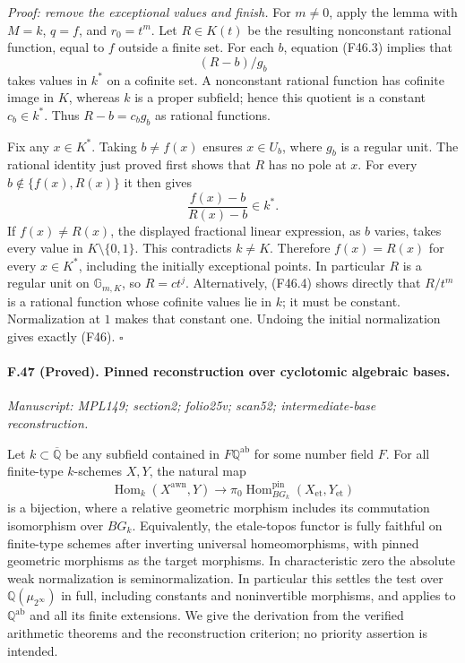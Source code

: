 \emph{Proof: remove the exceptional values and finish.}
For $m\ne0$, apply the lemma with $M=k$, $q=f$, and $r_0=t^m$.
Let $R\in K(t)$ be the resulting nonconstant rational function,
equal to $f$ outside a finite set. For each $b$, equation (F46.3)
implies that
\[
 (R-b)/g_b
\]
takes values in $k^*$ on a cofinite set. A nonconstant rational
function has cofinite image in $K$, whereas $k$ is a proper
subfield; hence this quotient is a constant $c_b\in k^*$.
Thus $R-b=c_b g_b$ as rational functions.

Fix any $x\in K^*$. Taking $b\ne f(x)$ ensures $x\in U_b$,
where $g_b$ is a regular unit. The rational identity just proved
first shows that $R$ has no pole at $x$. For every
$b\notin\{f(x),R(x)\}$ it then gives
\[
 \frac{f(x)-b}{R(x)-b}\in k^*.
\]
If $f(x)\ne R(x)$, the displayed fractional linear expression,
as $b$ varies, takes every value in $K\setminus\{0,1\}$.
This contradicts $k\ne K$. Therefore $f(x)=R(x)$ for every
$x\in K^*$, including the initially exceptional points.
In particular $R$ is a regular unit on $\mathbb G_{m,K}$, so
$R=c t^j$. Alternatively, (F46.4) shows directly that
$R/t^m$ is a rational function whose cofinite values lie in $k$;
it must be constant. Normalization at $1$ makes that constant one.
Undoing the initial normalization gives exactly (F46).
\hfill$\square$


\paragraph{F.47 (Proved). Pinned reconstruction over cyclotomic algebraic bases.}
\textit{Manuscript: MPL149; section2; folio25v; scan52; intermediate-base reconstruction.}

Let $k\subset\overline{\mathbb Q}$ be any subfield contained in
$F\mathbb Q^{\mathrm{ab}}$ for some number field $F$. For all
finite-type $k$-schemes $X,Y$, the natural map
\[
 \operatorname{Hom}_k(X^{\mathrm{awn}},Y)
   \longrightarrow
 \pi_0\operatorname{Hom}^{\mathrm{pin}}_{B G_k}
                 (X_{\mathrm{et}},Y_{\mathrm{et}})
\]
is a bijection, where a relative geometric morphism includes its
commutation isomorphism over $B G_k$. Equivalently, the etale-topos
functor is fully faithful on finite-type schemes after inverting
universal homeomorphisms, with pinned geometric morphisms as the
target morphisms. In characteristic zero the absolute weak
normalization is seminormalization. In particular this settles the
test over $\mathbb Q(\mu_{2^\infty})$ in full, including constants
and noninvertible morphisms, and applies to $\mathbb Q^{\mathrm{ab}}$
and all its finite extensions. We give the derivation from the
verified arithmetic theorems and the reconstruction criterion;
no priority assertion is intended.

